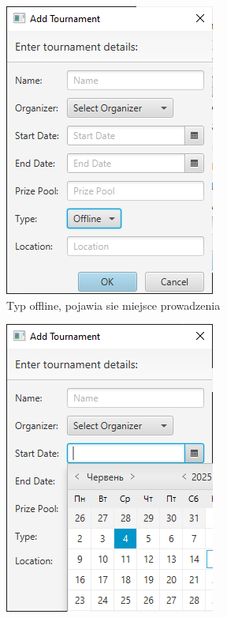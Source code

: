 \begin{figure}[H]
    \begin{subfigure}{0.3\textwidth}
        \centering
        \includegraphics[width=.8\linewidth]{figures/AddOffline.png}
        \caption{Typ offline, pojawia sie miejsce prowadzenia \label{subfigure_name}}
    \end{subfigure}
    \begin{subfigure}{0.3\textwidth}
        \centering
        \includegraphics[width=.8\linewidth]{figures/SelectingData.png}

\end{subfigure}
\end{figure}
